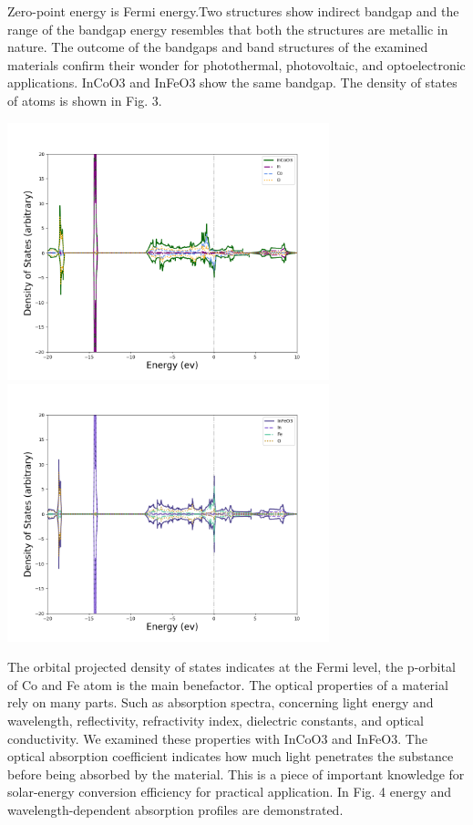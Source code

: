 \documentclass[12pt, letterpaper]{article}
\newcommand*{\1}{\hspace{1pt}}
\begin{document}
    
    Zero-point energy is Fermi energy.Two structures show indirect bandgap and the range of the bandgap 
    energy resembles that both the structures are metallic in nature. The outcome of the bandgaps and band structures of the examined materials confirm their wonder
    for photothermal, photovoltaic, and optoelectronic applications. InCoO3 and InFeO3 show the same bandgap. The density of states of atoms is shown in Fig. 3.
    
    \begin{adjustbox}{center,caption={Density of States Of InCoO3 and InFeO3},label={somelabel},nofloat=figure,vspace=\bigskipamount,}
        \includegraphics[width=0.7\textwidth]{DosInCoO3}
        \includegraphics[width=0.7\textwidth]{DosInFeO3}
    \end{adjustbox}
    
    The orbital projected density of states indicates at the Fermi level, the p-orbital of Co and Fe atom is the main benefactor. The optical properties of a 
    material rely on many parts. Such as absorption spectra, concerning light energy and wavelength, reflectivity, refractivity index, dielectric constants, and 
    optical conductivity. We examined these properties with InCoO3 and InFeO3.  The optical absorption coefficient indicates how much light penetrates the substance 
    before being absorbed by the material. This is a piece of important knowledge for solar-energy conversion efficiency for practical application. In Fig. 4 energy 
    and wavelength-dependent absorption profiles are demonstrated.
    
\end{document}
